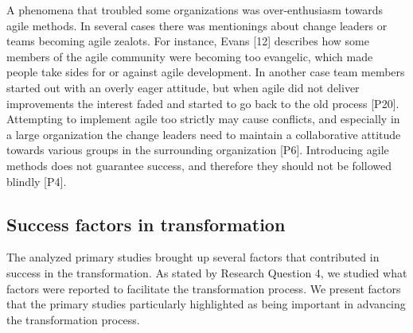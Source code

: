 \documentclass[preprint,authoryear,12pt]{elsarticle}
\begin{document}

A phenomena that troubled some organizations was over-enthusiasm towards agile
methods. In several cases there was mentionings about change leaders or teams
becoming agile zealots. For instance, Evans [12] describes how some members of
the agile community were becoming too evangelic, which made people take sides
for or against agile development. In another case team members started out with
an overly eager attitude, but when agile did not deliver improvements the
interest faded and started to go back to the old process [P20]. Attempting to
implement agile too strictly may cause conflicts, and especially in a large
organization the change leaders need to maintain a collaborative attitude
towards various groups in the surrounding organization [P6]. Introducing agile
methods does not guarantee success, and therefore they should not be followed
blindly [P4].






\clearpage

\subsection{Success factors in transformation}

The analyzed primary studies brought up several factors that contributed in
success in the transformation. As stated by Research Question 4, we studied what
factors were reported to facilitate the transformation process. We present
factors that the primary studies particularly highlighted as being important in
advancing the transformation process.
\end{document}
